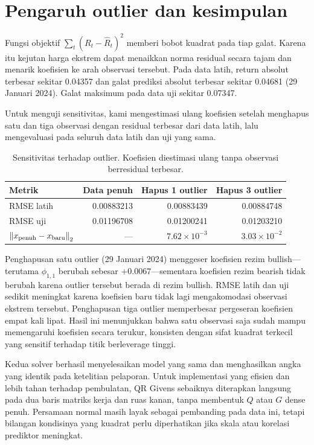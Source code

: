 \documentclass[11pt,a4paper]{article}
\newcommand{\norm}[1]{\left\lVert #1\right\rVert_2}
\begin{document}
\section{Pengaruh outlier dan kesimpulan}
Fungsi objektif $\sum_t(R_t-\widehat R_t)^2$ memberi bobot kuadrat pada tiap galat. Karena itu kejutan harga ekstrem dapat menaikkan norma residual secara tajam dan menarik koefisien ke arah observasi tersebut. Pada data latih, return absolut terbesar sekitar 0.04357 dan galat prediksi absolut terbesar sekitar 0.04681 (29 Januari 2024). Galat maksimum pada data uji sekitar 0.07347.

Untuk menguji sensitivitas, kami mengestimasi ulang koefisien setelah menghapus satu dan tiga observasi dengan residual terbesar dari data latih, lalu mengevaluasi pada seluruh data latih dan uji yang sama.

\begin{table}[H]
\centering
\caption{Sensitivitas terhadap outlier. Koefisien diestimasi ulang tanpa observasi berresidual terbesar.}
\begin{tabular}{lrrr}
\toprule
Metrik & Data penuh & Hapus 1 outlier & Hapus 3 outlier\\
\midrule
RMSE latih & 0.00883213 & 0.00883439 & 0.00884748\\
RMSE uji & 0.01196708 & 0.01200241 & 0.01203210\\
$\norm{x_{\rm penuh}-x_{\rm baru}}$ & --- & $7.62\times10^{-3}$ & $3.03\times10^{-2}$\\
\bottomrule
\end{tabular}
\end{table}

Penghapusan satu outlier (29 Januari 2024) menggeser koefisien rezim bullish---terutama $\phi_{1,1}$ berubah sebesar $+0.0067$---sementara koefisien rezim bearish tidak berubah karena outlier tersebut berada di rezim bullish. RMSE latih dan uji sedikit meningkat karena koefisien baru tidak lagi mengakomodasi observasi ekstrem tersebut. Penghapusan tiga outlier memperbesar pergeseran koefisien empat kali lipat. Hasil ini menunjukkan bahwa satu observasi saja sudah mampu memengaruhi koefisien secara terukur, konsisten dengan sifat kuadrat terkecil yang sensitif terhadap titik berleverage tinggi.

Kedua solver berhasil menyelesaikan model yang sama dan menghasilkan angka yang identik pada ketelitian pelaporan. Untuk implementasi yang efisien dan lebih tahan terhadap pembulatan, QR Givens sebaiknya diterapkan langsung pada dua baris matriks kerja dan ruas kanan, tanpa membentuk $Q$ atau $G$ dense penuh. Persamaan normal masih layak sebagai pembanding pada data ini, tetapi bilangan kondisinya yang kuadrat perlu diperhatikan jika skala atau korelasi prediktor meningkat.
\end{document}
